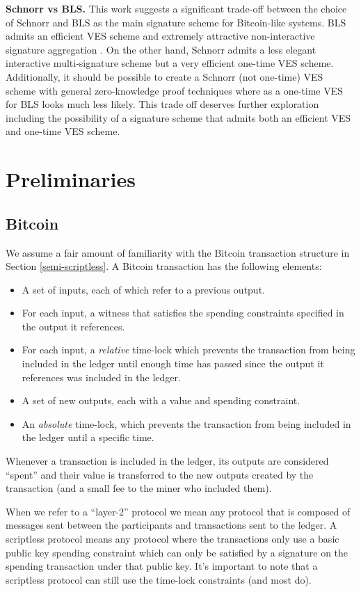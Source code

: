 \documentclass[fullpage]{article}
\theoremstyle{definition}
\begin{document}
\hfill \break \textbf{Schnorr vs BLS.} This work suggests a significant trade-off between the choice of Schnorr and BLS as the main signature scheme for Bitcoin-like systems. BLS admits an efficient VES scheme\cite{Boneh:2003:AVE:1766171.1766207} and extremely attractive non-interactive signature aggregation \cite{compact-blockchains-bls}. On the other hand, Schnorr admits a less elegant interactive multi-signature scheme\cite{musig} but a very efficient one-time VES scheme. Additionally, it should be possible to create a Schnorr (not one-time) VES scheme with general zero-knowledge proof techniques where as a one-time VES for BLS looks much less likely. This trade off deserves further exploration including  the possibility of a signature scheme that admits both an efficient VES and one-time VES scheme.

\section{Preliminaries}

\subsection{Bitcoin}
We assume a fair amount of familiarity with the Bitcoin transaction structure in Section \ref{semi-scriptless}. A Bitcoin transaction has the following elements:
\begin{itemize}
    \item A set of inputs, each of which refer to a previous output.
    \item For each input, a witness that satisfies the spending constraints specified in the output it references.
    \item For each input, a \emph{relative} time-lock which prevents the transaction from being included in the ledger until enough time has passed since the output it references was included in the ledger.
    \item A set of new outputs, each with a value and spending constraint.
    \item An \emph{absolute} time-lock, which prevents the transaction from being included in the ledger until a specific time.
\end{itemize}
Whenever a transaction is included in the ledger, its outputs are considered ``spent'' and their value is transferred to the new outputs created by the transaction (and a small fee to the miner who included them).

When we refer to a ``layer-2'' protocol we mean any protocol that is composed of messages sent between the participants and transactions sent to the ledger. A scriptless protocol means any protocol where the transactions only use a basic public key spending constraint which can only be satisfied by a signature on the spending transaction under that public key. It's important to note that a scriptless protocol can still use the time-lock constraints (and most do).
\end{document}
